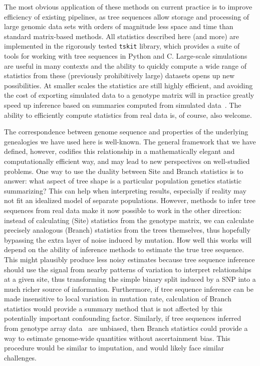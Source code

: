 \documentclass{article}
\newcommand{\tskit}{{\texttt{tskit}}}
\begin{document}
The most obvious application of these methods on current practice
is to improve efficiency of existing pipelines,
as tree sequences allow storage and processing of large genomic data sets
with orders of magnitude less space and time than standard matrix-based methods.
All statistics described here (and more) are implemented
in the rigorously tested \tskit{} library,
which provides a suite of tools for working with tree sequences in Python and C.
Large-scale simulations are useful in many contexts
\citep[e.g.,][]{martin2017human,browning2018one,galloway2019stickleback}
and the ability to quickly compute a wide range of statistics from
these (previously prohibitively large) datasets opens up new possibilities.
At smaller scales the statistics are still highly efficient, and avoiding
the cost of exporting simulated data to a genotype matrix will in practice greatly
speed up inference based on summaries computed from simulated
data~\citep{beaumont2002approximate,csillery2010approximate,schrider2018supervised,flagel2018unreasonable}.
The ability to efficiently compute statistics from real data is, of course, also welcome.

The correspondence between genome sequence and properties of the
underlying genealogies we have used here is well-known. The general framework
that we have defined, however, codifies this relationship in a
mathematically elegant and computationally efficient way, and may lead to
new perspectives on well-studied problems.
One way to use the duality between Site and Branch statistics is to answer:
what aspect of tree shape is a particular population genetics statistic summarizing?
This can help when interpreting results, especially if reality may not fit an idealized model
of separate populations.
However, methods to infer tree sequences from real data
make it now possible to work in the other direction:
instead of calculating (Site) statistics from the genotype matrix,
we can calculate precisely analogous (Branch) statistics from the trees themselves,
thus hopefully bypassing the extra layer of noise induced by mutation.
How well this works will depend on the ability of inference methods
to estimate the true tree sequence.
This might plausibly produce less noisy estimates because tree sequence inference
should use the signal from nearby patterns of variation
to interpret relationships at a given site,
thus transforming the simple binary split induced by a SNP
into a much richer source of information.
Furthermore,
if tree sequence inference can be made insensitive to local variation in mutation rate,
calculation of Branch statistics would provide a summary method
that is not affected by this potentially important confounding factor.
Similarly, if tree sequences inferred from
genotype array data~\citep{kelleher2019inferring} are unbiased,
then Branch statistics could provide a way
to estimate genome-wide quantities without ascertainment bias.
This procedure would be similar to imputation, and would likely face similar challenges.
\end{document}
